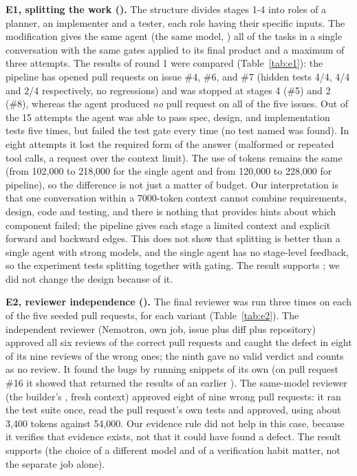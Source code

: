 \textbf{E1, splitting the work ().} The structure divides stages 1-4 into roles of a planner, an implementer and a tester, each role having their specific inputs. The modification gives the same agent (the same model, ) all of the tasks in a single conversation with the same gates applied to its final product and a maximum of three attempts. The results of round 1 were compared (Table~\ref{tab:e1}): the pipeline has opened pull requests on issue \#4, \#6, and \#7 (hidden tests 4/4, 4/4 and 2/4 respectively, no regressions) and was stopped at stages 4 (\#5) and 2 (\#8), whereas the agent produced \emph{no} pull request on all of the five issues. Out of the 15 attempts the agent was able to pass spec, design, and implementation tests five times, but failed the test gate every time (no test named  was found). In eight attempts it lost the required form of the answer (malformed or repeated tool calls, a request over the context limit). The use of tokens remains the same (from 102,000 to 218,000 for the single agent and from 120,000 to 228,000 for pipeline), so the difference is not just a matter of budget. Our interpretation is that one conversation within a 7000-token context cannot combine requirements, design, code and testing, and there is nothing that provides hints about which component failed; the pipeline gives each stage a limited context and explicit forward and backward edges. This does not show that splitting is better than a single agent with strong models, and the single agent has no stage-level feedback, so the experiment tests splitting together with gating. The result supports ; we did not change the design because of it.

\textbf{E2, reviewer independence ().} The final reviewer was run three times on each of the five seeded pull requests, for each variant (Table~\ref{tab:e2}). The independent reviewer (Nemotron, own job, issue plus diff plus repository) approved all six reviews of the correct pull requests and caught the defect in eight of its nine reviews of the wrong ones; the ninth gave no valid verdict and counts as no review. It found the bugs by running snippets of its own (on pull request \#16 it showed that  returned the results of an earlier ). The same-model reviewer (the builder's , fresh context) approved eight of nine wrong pull requests: it ran the test suite once, read the pull request's own tests and approved, using about 3,400 tokens against 54,000. Our evidence rule did not help in this case, because it verifies that evidence exists, not that it could have found a defect. The result supports  (the choice of a different model and of a verification habit matter, not the separate job alone).

